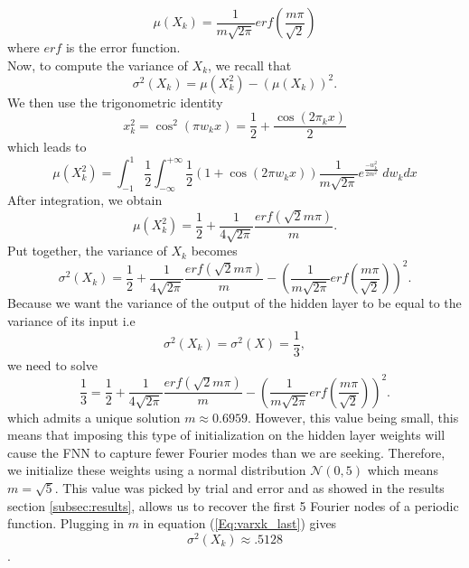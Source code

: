 \documentclass[AMS,STIX1COL]{WileyNJD-v2}
\begin{document}
\begin{enumerate}
\begin{equation}\label{Eq:muxk_last}
    \mu(X_k) = \frac{1}{m\sqrt{2\pi}}erf\left(\frac{m\pi}{\sqrt{2}}\right) 
\end{equation}
where $erf$ is the error function.\\
Now, to compute the variance of $X_k$, we recall that
$$\sigma^2(X_k) = \mu(X_k^2) - (\mu(X_k))^2.$$ 
We then use the trigonometric identity $$x_k^2 = \cos^2(\pi w_k x) = \frac{1}{2} + \frac{\cos(2\pi _kx)}{2}$$ which leads to
\begin{equation*}
    \mu(X_k^2) = \int_{-1}^{1}\frac{1}{2} \int_{-\infty}^{+\infty} \frac{1}{2}(1 + \cos(2 \pi w_k x))\frac{1}{m \sqrt{2\pi}} e^{\frac{-w_k^2}{2m^2}}\; dw_k dx
\end{equation*}
After integration, we obtain 
$$\mu(X_k^2) = \frac{1}{2} + \frac{1}{4\sqrt{2\pi}}\frac{erf\left(\sqrt{2}m\pi\right)}{m}.$$
Put together, the variance of $X_k$ becomes
\begin{equation}\label{Eq:varxk_last}
    \sigma^2(X_k) = \frac{1}{2} + \frac{1}{4\sqrt{2\pi}}\frac{erf(\sqrt{2}m\pi)}{m}-\left(\frac{1}{m\sqrt{2\pi}}erf\left(\frac{m\pi}{\sqrt{2}}\right) \right)^2 .
\end{equation}
Because we want the variance of the output of the hidden layer to be equal to the variance of its input i.e $$\sigma^2(X_k) = \sigma^2(X) = \frac{1}{3}, $$ we need to solve 
\begin{equation*}
    \frac{1}{3} = \frac{1}{2} + \frac{1}{4\sqrt{2\pi}}\frac{erf(\sqrt{2}m\pi)}{m}-\left(\frac{1}{m\sqrt{2\pi}}erf\left(\frac{m\pi}{\sqrt{2}}\right) \right)^2 .
\end{equation*}
which admits a unique solution $m \approx 0.6959$. However, this value being small, this means that imposing this type of initialization on the hidden layer weights will cause the FNN to capture fewer Fourier modes than we are seeking. Therefore, we initialize these weights using a normal distribution $\mathcal N(0,5)$ which means $m = \sqrt{5}$. This value was picked by trial and error and as showed in the results section \ref{subsec:results}, allows us to recover the first 5 Fourier nodes of a periodic function. Plugging in $m$ in equation (\ref{Eq:varxk_last}) gives
$$\sigma^2(X_k) \approx .5128$$. 
    

\end{enumerate}
\end{document}
